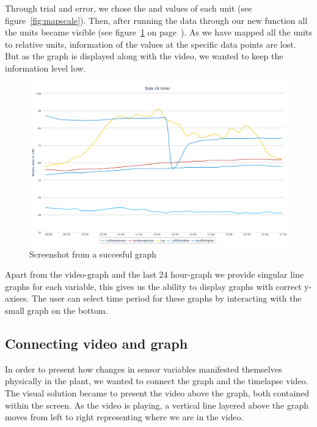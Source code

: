 Through trial and error, we chose the \verb@C@ and \verb@D@ values of each unit (see figure~\ref{fig:mapscale}). Then, after running the data through our new function all the units became visible (see figure~\ref{fig:goodgraph} on page~\pageref{fig:goodgraph}). As we have mapped all the units to relative units, information of the values at the specific data points are lost. But as the graph is displayed along with the video, we wanted to keep the information level low.  

\begin{figure}
\centering
\includegraphics[width=1\textwidth]{img/interface/goodgraph.png}
\caption{Screenshot from a succesful graph}
\label{fig:goodgraph}
\end{figure}


Apart from the video-graph and the last 24 hour-graph we provide singular line graphs for each variable, this gives us the ability to display graphs with correct y-axises. The user can select time period for these graphs by interacting with the small graph on the bottom. 

\subsection{Connecting video and graph}
In order to present how changes in sensor variables manifested themselves physically in the plant, we wanted to connect the graph and the timelapse video. The visual solution became to present the video above the graph, both contained within the screen. As the video is playing, a vertical line layered above the graph moves from left to right representing where we are in the video. 

